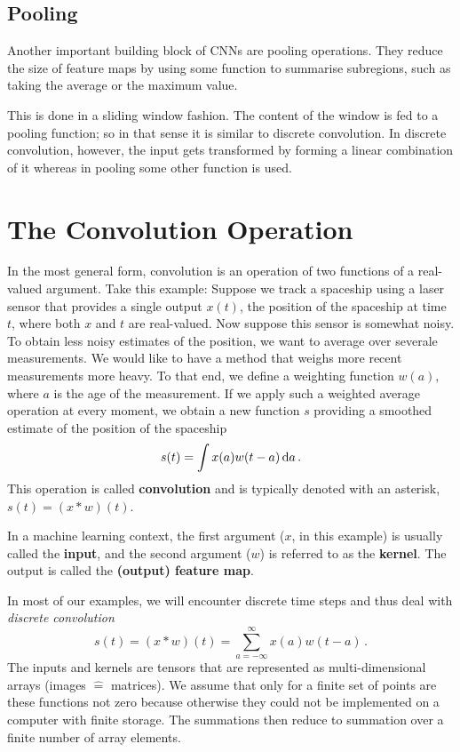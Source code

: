 \subsection*{Pooling}
Another important building block of CNNs are pooling operations. They reduce the
size of feature maps by using some function to summarise subregions, such as
taking the average or the maximum value.

This is done in a sliding window fashion. The content of the window is fed to a
pooling function; so in that sense it is similar to discrete convolution. In discrete
convolution, however, the input gets transformed by forming a linear combination of it whereas in pooling some other function is used.

\section{The Convolution Operation}
In the most general form, convolution is an operation of two functions of a
real-valued argument. Take this example: Suppose we track a spaceship using a
laser sensor that provides a single output $x(t)$, the position of the spaceship
at time $t$, where both $x$ and $t$ are real-valued. Now suppose this sensor is
somewhat noisy. To obtain less noisy estimates of the position, we want to
average over severale measurements. We would like to have a method that weighs
more recent measurements more heavy. To that end, we define a weighting function
$w(a)$, where $a$ is the age of the measurement. If we apply such a weighted
average operation at every moment, we obtain a new function $s$ providing a
smoothed estimate of the position of the spaceship
\begin{equation*}
  s(t) = \int x(a)w(t-a) \,\mathrm{d}a\,.
\end{equation*}
This operation is called \textbf{convolution} and is typically denoted with an
asterisk, \ie $s(t) = (x \ast w)(t)$.

In a machine learning context, the first argument ($x$, in this example) is
usually called the \textbf{input}, and the second argument ($w$) is referred to
as the \textbf{kernel}. The output is called the \textbf{(output) feature map}.

In most of our examples, we will encounter discrete time steps and thus deal
with \emph{discrete convolution}
\begin{equation*}
  s(t) = (x \ast w)(t) = \sum_{a = -\infty}^\infty x(a) w(t - a)\,.
\end{equation*}
The inputs and kernels are tensors that are represented as multi-dimensional
arrays (\eg images $\hat=$ matrices). We assume that only for a finite set of
points are these functions not zero because otherwise they could not be
implemented on a computer with finite storage. The summations then reduce to
summation over a finite number of array elements.

